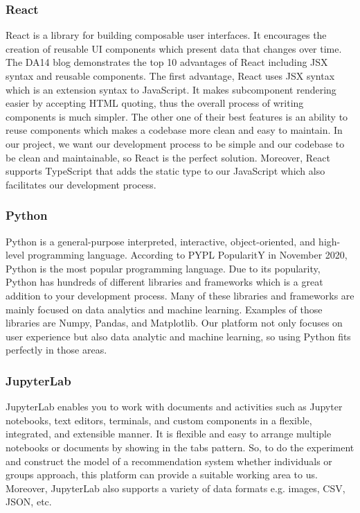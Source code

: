 \documentclass[12pt,oneside,openright,a4paper]{cpe-english-project}
\begin{document}
\subsubsection{React}

React is a library for building composable user interfaces. It encourages the creation of reusable UI components which present data that changes over time. \cite{WhydidwebuildReact} The DA14 blog \cite{TOP10ADVANTAGESOFUSINGREACTJS} demonstrates the top 10 advantages of React including JSX syntax and reusable components. The first advantage, React uses JSX syntax which is an extension syntax to JavaScript. It makes subcomponent rendering easier by accepting HTML quoting, thus the overall process of writing components is much simpler. The other one of their best features is an ability to reuse components which makes a codebase more clean and easy to maintain. In our project, we want our development process to be simple and our codebase to be clean and maintainable, so React is the perfect solution. Moreover, React supports TypeScript that adds the static type to our JavaScript which also facilitates our development process.

\subsubsection{Python}

Python is a general-purpose interpreted, interactive, object-oriented, and high-level programming language. \cite{PythonTutorial} According to PYPL PopularitY in November 2020, Python is the most popular programming language. Due to its popularity, Python has hundreds of different libraries and frameworks which is a great addition to your development process. \cite{Top7ReasonsWhyYouNeedtoLearnPythonasaDataScientist} Many of these libraries and frameworks are mainly focused on data analytics and machine learning. Examples of those libraries are Numpy, Pandas, and Matplotlib. Our platform not only focuses on user experience but also data analytic and machine learning, so using Python fits perfectly in those areas.

\subsubsection{JupyterLab}

JupyterLab enables you to work with documents and activities such as Jupyter notebooks, text editors, terminals, and custom components in a flexible, integrated, and extensible manner. \cite{JupyterLabOverview} It is flexible and easy to arrange multiple notebooks or documents by showing in the tabs pattern. So, to do the experiment and construct the model of a recommendation system whether individuals or groups approach, this platform can provide a suitable working area to us. Moreover, JupyterLab also supports a variety of data formats e.g. images, CSV, JSON, etc.
\end{document}
